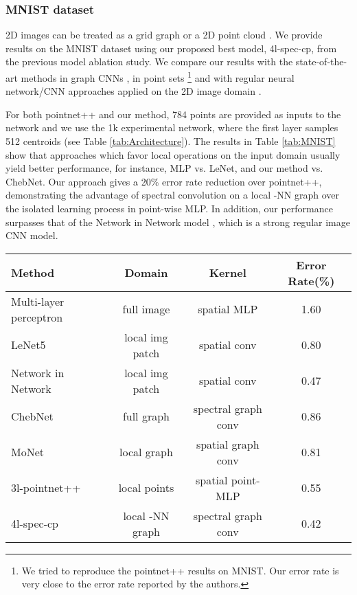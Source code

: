 \documentclass[runningheads]{llncs}
\begin{document}
\subsubsection{MNIST dataset}\label{sec:exp_mnist}
2D images can be treated as a grid graph \cite{defferrard2016convolutional,monti2016geometric} or a 2D point cloud \cite{qi2017pointnet}. We provide results on the MNIST dataset using our proposed best model, 4l-spec-cp, from the previous model ablation study. We compare our results with the state-of-the-art methods in graph CNNs \cite{defferrard2016convolutional,monti2016geometric}, in point sets \cite{qi2017pointnet} \footnote{We tried to reproduce the pointnet++ results on MNIST. Our  error rate is very close to the  error rate reported by the authors.} and with regular neural network/CNN approaches applied on the 2D image domain \cite{simard2003best,lecun1998gradient,lin2013network}.

For both pointnet++ and our method, 784 points are provided as inputs to the network and we use the 1k experimental network, where the first layer samples 512 centroids (see Table \ref{tab:Architecture}).
The results in Table \ref{tab:MNIST} show that approaches which favor local operations on the input domain usually yield better performance, for instance, MLP vs. LeNet, and our method vs. ChebNet. Our approach gives a 20\% error rate reduction over pointnet++, demonstrating the advantage of spectral convolution on a local -NN graph over the isolated learning process in point-wise MLP. In addition, our performance surpasses that of the Network in Network model \cite{lin2013network}, which is a strong regular image CNN model.


\begin{table*}[h]
	\renewcommand{\arraystretch}{1.2}
	\centering
	\small
	\vspace{-0.5cm}
	\begin{tabular}{@{}l|c|c|c}
		\hline
		Method & Domain & Kernel & Error Rate(\%) \\ \hline
		Multi-layer perceptron \cite{simard2003best} & full image & spatial MLP& 1.60  \\
		LeNet5 \cite{lecun1998gradient} & local img patch & spatial conv & 0.80  \\
		Network in Network \cite{lin2013network} & local img patch & spatial conv & 0.47 \\ \hline
		ChebNet \cite{defferrard2016convolutional} & full graph & spectral graph conv & 0.86 \\
		MoNet \cite{monti2016geometric} & local graph & spatial graph conv & 0.81 \\ \hline
		3l-pointnet++ \cite{qi2017pointnet} & local points & spatial point-MLP &  0.55 \\
		4l-spec-cp & local -NN graph & spectral graph conv & \cellcolor{pink} 0.42  \\ \hline
	\end{tabular}
	\vspace{0.2cm}
	\caption{Results on the MNIST dataset. For the pointnet++ results, we reproduced their experiments, as discussed in \cite{qi2017pointnet}.}
	\label{tab:MNIST}
	\vspace{-1.6cm}
\end{table*}
\end{document}
